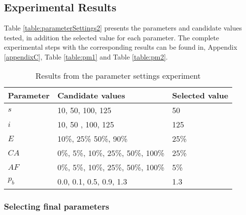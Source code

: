 


\subsection{Experimental Results}
\label{subsec:parameterSettings_results}

Table \vref{table:parameterSettings2} presents the parameters and candidate values tested, in addition the selected value for each parameter. The complete experimental steps with the corresponding results can be found in, Appendix \ref{appendixC}, Table \vref{table:pm1} and Table \vref{table:pm2}. 

    \begin{table}[H]
    \centering
    \begin{tabular}{|l|l||l|}
    \hline
    \textbf{Parameter} & \textbf{Candidate values} & \textbf{Selected value}\\
    \hline
    $s$ & 10, 50, 100, 125 & 50 \\
    $i$ & 10, 50 , 100, 125 & 125\\
    $E$ & 10\%, 25\% 50\%, 90\% & 25\% \\
    $CA$ & 0\%, 5\%, 10\%, 25\%, 50\%, 100\% & 25\% \\
    $AF$ & 0\%, 5\%, 10\%, 25\%, 50\%, 100\% & 5\% \\
    $p_{b}$ & 0.0, 0.1, 0.5, 0.9, 1.3 & 1.3 \\
    \hline
    \end{tabular}
    \caption {Results from the parameter settings experiment}
    \label{table:parameterSettings2}
    \end{table}
    
\subsubsection*{Selecting final parameters}

